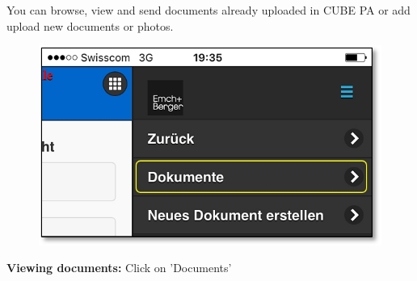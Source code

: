 \vspace{.5cm}

You can browse, view and send documents already uploaded in CUBE PA or add upload new documents or photos.

\vspace{\baselineskip}

\begin{figure}   %
  \vspace{-35pt}      %
  \begin{center}
    \includegraphics[width=1\linewidth]{../chapters/11_Dokumentenablage/pictures/11-mob02_Dokumente_anschauen.jpg}
  \end{center}
  \vspace{-20pt}
  \vspace{-10pt}
\end{figure}


\textbf{Viewing documents:} Click on 'Documents'

\pagebreak

